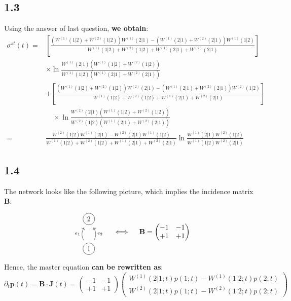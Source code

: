 \documentclass[11pt]{article}
\begin{document}
	\subsection*{1.3}
	Using the answer of last question, \textbf{we obtain}:
	\[
	\begin{aligned}
		\sigma^{st}(t)=&\left[\frac{\left(W^{(1)}(1|2)+W^{(2)}(1|2)\right)W^{(1)}(2|1)-\left(W^{(1)}(2|1)+W^{(2)}(2|1)\right)W^{(1)}(1|2)}{W^{(1)}(1|2)+W^{(2)}(1|2)+W^{(1)}(2|1)+W^{(2)}(2|1)}\right]\\
		&\times\ln\frac{W^{(1)}(2|1)\left(W^{(1)}(1|2)+W^{(2)}(1|2)\right)}{W^{(1)}(1|2)\left(W^{(1)}(2|1)+W^{(2)}(2|1)\right)}
		\\&+\left[\frac{\left(W^{(1)}(1|2)+W^{(2)}(1|2)\right)W^{(2)}(2|1)-\left(W^{(1)}(2|1)+W^{(2)}(2|1)\right)W^{(2)}(1|2)}{W^{(1)}(1|2)+W^{(2)}(1|2)+W^{(1)}(2|1)+W^{(2)}(2|1)}\right]\\
		&\quad\times\ln\frac{W^{(2)}(2|1)\left(W^{(1)}(1|2)+W^{(2)}(1|2)\right)}{W^{(2)}(1|2)\left(W^{(1)}(2|1)+W^{(2)}(2|1)\right)}\\
		=&\boxed{
			\frac{W^{(2)}(1|2)W^{(1)}(2|1)-W^{(2)}(2|1)W^{(1)}(1|2)}{W^{(1)}(1|2)+W^{(2)}(1|2)+W^{(1)}(2|1)+W^{(2)}(2|1)}\ln\frac{W^{(1)}(2|1)W^{(2)}(1|2)}{W^{(1)}(1|2)W^{(2)}(2|1)}
		}
	\end{aligned}
	\]
	\subsection*{1.4}
	The network looks like the following picture, which implies the incidence matrix $\mathbf{B}$:
	\[
		\begin{tikzcd}
		{\tikz[baseline=(X.base)] \node[draw,circle,inner sep=3pt,minimum size=16pt] (X) {2};} \\
		{\tikz[baseline=(X.base)] \node[draw,circle,inner sep=3pt,minimum size=16pt] (X) {1};} 
		\arrow["{e_1}", bend left=30, from=2-1, to=1-1]
		\arrow["{e_2}"', bend right=30, from=2-1, to=1-1]
	\end{tikzcd}\quad\iff\quad
	\mathbf{B}=\begin{pmatrix}
		-1&-1\\
		+1&+1
	\end{pmatrix}
	\]
	Hence, the master equation \textbf{can be rewritten as}:
	\[
	\boxed{
		\partial_t\mathbf{p}(t)=\mathbf{B}\cdot\mathbf{J}(t)=\begin{pmatrix}
			-1&-1\\
			+1&+1
		\end{pmatrix}\begin{pmatrix}
			W^{(1)}(2|1;t)p(1;t)-W^{(1)}(1|2;t)p(2;t)\\
			W^{(2)}(2|1;t)p(1;t)-W^{(2)}(1|2;t)p(2;t)
		\end{pmatrix}
	}
	\]
\end{document}
